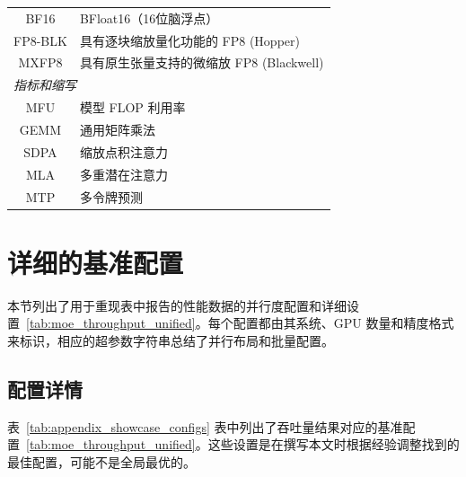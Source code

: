 \documentclass[10pt,logo,copyright]{nvidiatechreport_zh}
\begin{document}
\begin{table}[ht]
\begin{tabular}{cl}
BF16 & BFloat16（16位脑浮点） \\
FP8-BLK & 具有逐块缩放量化功能的 FP8 (Hopper) \\
MXFP8 & 具有原生张量支持的微缩放 FP8 (Blackwell) \\
\midrule
\multicolumn{2}{l}{\emph{指标和缩写}} \\
MFU & 模型 FLOP 利用率 \\
GEMM & 通用矩阵乘法 \\
SDPA & 缩放点积注意力 \\
MLA & 多重潜在注意力 \\
MTP & 多令牌预测 \\
\bottomrule
\end{tabular}
\end{table}


\section{详细的基准配置}\label{sec:showcase_settings}

本节列出了用于重现表中报告的性能数据的并行度配置和详细设置~\ref{tab:moe_throughput_unified}。每个配置都由其系统、GPU 数量和精度格式来标识，相应的超参数字符串总结了并行布局和批量配置。 

\subsection{配置详情} 
表~\ref{tab:appendix_showcase_configs} 表中列出了吞吐量结果对应的基准配置~\ref{tab:moe_throughput_unified}。这些设置是在撰写本文时根据经验调整找到的最佳配置，可能不是全局最优的。
\end{document}
